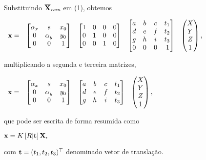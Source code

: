 Substituindo $\overline{\mathbf{X}}_{\textit{cam}}$ em (1), obtemos

\begin{center}
$
\begin{array}{ccccc}
\mathbf{x}=
&
\begin{bmatrix}
\alpha_x&s&x_0\\
0&\alpha_y&y_0\\
0&0&1
\end{bmatrix}&
\begin{bmatrix}
1&0&0&0\\
0&1&0&0\\
0&0&1&0
\end{bmatrix}
&
\begin{bmatrix}
a&b&c&t_1\\
d&e&f&t_2\\
g&h&i&t_3\\
0&0&0&\,1
\end{bmatrix}
&
\begin{pmatrix}
X\\
Y\\
Z\\
1
\end{pmatrix},
\end{array}
$
\end{center}
multiplicando a segunda e terceira matrizes,
 
\begin{center}
$
\begin{array}{cccc}
\mathbf{x}=
&
\begin{bmatrix}
\alpha_x&s&x_0\\
0&\alpha_y&y_0\\
0&0&1
\end{bmatrix}&
\begin{bmatrix}
a&b&c&t_1\\
d&e&f&t_2\\
g&h&i&t_3
\end{bmatrix}
&
\begin{pmatrix}
X\\
Y\\
Z\\
1
\end{pmatrix},
\end{array}
$
\end{center}
que pode ser escrita de forma resumida como

\begin{center}
$
\mathbf{x}=K\,[R|{\bf t}]\,\mathbf{X},
$
\end{center}
com ${\bf t}=(t_1,t_2,t_3)^\top$ denominado vetor de translação.

